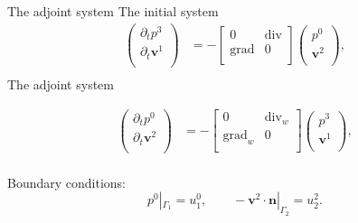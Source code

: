 \documentclass[aspectratio=169]{beamer}
\DeclareMathOperator*{\grad}{grad}
\renewcommand{\div}{\operatorname{div}}
\begin{document}
\begin{frame}{The adjoint system}
The initial system
	\begin{equation*}
		\begin{aligned}
			\begin{pmatrix}
				\partial_t p^3 \\
				\partial_t \bm{v}^1\\
			\end{pmatrix} &= 
			-\begin{bmatrix}
				0 & \div \\
				\grad & 0 \\
			\end{bmatrix}
			\begin{pmatrix}
				p^0\\
			 \bm{v}^2\\
			\end{pmatrix}, \\
		\end{aligned}	
	\end{equation*}
The adjoint system

\begin{equation*}
	\begin{aligned}
		\begin{pmatrix}
			\partial_t p^0 \\
			\partial_t \bm{v}^2\\
		\end{pmatrix} &= 
		-\begin{bmatrix}
			0 & \div_w \\
			\grad_w & 0 \\
		\end{bmatrix}
		\begin{pmatrix}
			p^3\\
			\bm{v}^1\\
		\end{pmatrix}, \\
	\end{aligned}	
\end{equation*}

Boundary conditions:
\begin{equation*}
		p^0|_{\Gamma_1} = u^0_1, \qquad
		-\bm{v}^2\cdot \bm{n}|_{\Gamma_2}  = u^{2}_2.
\end{equation*}

\end{frame}
\end{document}
